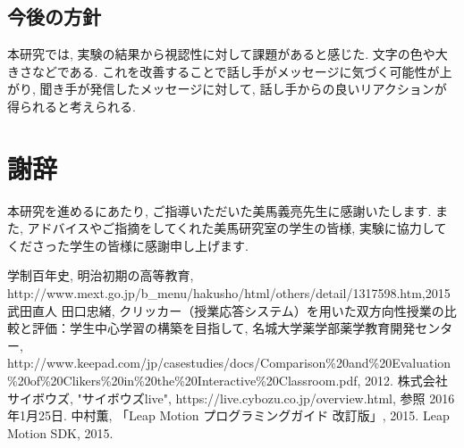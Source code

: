\documentclass{funthesis}
\begin{document}

\section{今後の方針}
本研究では, 実験の結果から視認性に対して課題があると感じた. 文字の色や大きさなどである. これを改善することで話し手がメッセージに気づく可能性が上がり, 聞き手が発信したメッセージに対して, 話し手からの良いリアクションが得られると考えられる. 



\chapter*{謝辞}
本研究を進めるにあたり, ご指導いただいた美馬義亮先生に感謝いたします. また, アドバイスやご指摘をしてくれた美馬研究室の学生の皆様, 実験に協力してくださった学生の皆様に感謝申し上げます. 


\begin{thebibliography}{9}
  学制百年史, 明治初期の高等教育, http://www.mext.go.jp/b\_menu/hakusho/html/others/detail/1317598.htm,2015
    武田直人 田口忠緒,  クリッカー（授業応答システム）を用いた双方向性授業の比較と評価：学生中心学習の構築を目指して, 名城大学薬学部薬学教育開発センター, http://www.keepad.com/jp/casestudies/docs/Comparison\%20and\%20Evaluation\%20of\%20Clikers\%20in\%20the\%20Interactive\%20Classroom.pdf, 2012.
  株式会社サイボウズ, "サイボウズlive", https://live.cybozu.co.jp/overview.html, 参照 2016年1月25日.
   中村薫, 「Leap Motion プログラミングガイド 改訂版」, 2015.
   Leap Motion SDK, 2015.
\end{thebibliography}
\end{document}
